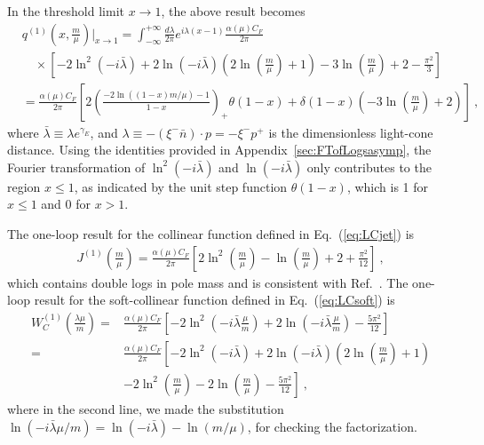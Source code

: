 \documentclass[a4paper,11pt]{article}
\begin{document}
In the threshold limit $x \rightarrow 1$, the above result becomes
\begin{align}\label{eq:LCpdfq1loopfmtr}
&q^{(1)}\left(x, \frac{m}{\mu}\right) \bigg|_{x \rightarrow 1}
= \int_{-\infty}^{+\infty} \frac{d \lambda}{2\pi} e^{i \lambda (x-1)} \frac{\alpha(\mu) C_F}{2 \pi} \nonumber\\
&\quad \times \left[ - 2 \ln^2\left(-i \bar{\lambda}\right) + 2 \ln\left(-i \bar{\lambda}\right) \left( 2 \ln\left(\frac{m}{\mu}\right) + 1 \right) - 3 \ln\left(\frac{m}{\mu}\right)+2-\frac{\pi ^2}{3} \right] \nonumber\\
&= \frac{\alpha(\mu) C_F}{2 \pi} \left[ 2 \left(\frac{- 2 \ln\left((1-x) m/\mu\right) - 1}{1-x} \right)_{+} \theta(1-x) + \delta(1-x) \left(-3\ln\left(\frac{m}{\mu}\right)+2\right) \right] \ ,
\end{align}
where $\bar{\lambda} \equiv \lambda e^{\gamma_E}$, and $\lambda \equiv - (\xi^{-} \bar{n}) \cdot p = - \xi^{-} p^{+}$ is the dimensionless light-cone distance. Using the identities provided in Appendix~\ref{sec:FTofLogsasymp}, the Fourier transformation of $\ln^2\left(-i \bar{\lambda}\right)$ and $\ln\left(-i \bar{\lambda}\right)$ only contributes to the region $x \leq 1$, as indicated by the unit step function $\theta(1-x)$, which is 1 for $x \leq 1$ and 0 for $x>1$.

The one-loop result for the collinear function defined in Eq.~(\ref{eq:LCjet}) is
\begin{align}\label{eq:Z1loopfm}
J^{(1)}\left(\frac{m}{\mu}\right) = \frac{\alpha(\mu) C_F}{2\pi} 
\left[ 2 \ln^2\left(\frac{m}{\mu}\right)
- \ln\left(\frac{m}{\mu}\right)
+ 2 + \frac{\pi ^2}{12} \right] \ ,
\end{align}
which contains double logs in pole mass and is consistent with Ref.~\cite{Beneke:2023nmj}. The one-loop result for the soft-collinear function defined in Eq.~(\ref{eq:LCsoft}) is
\begin{align}\label{eq:WC1loopfm}
W_C^{(1)}\left(\frac{\lambda\mu}{m}\right) 
= & \frac{\alpha(\mu) C_F}{2\pi} \left[-2 \ln^2\left(-i \bar{\lambda} \frac{\mu}{m}\right) + 2 \ln\left(-i \bar{\lambda} \frac{\mu}{m} \right) -\frac{5 \pi ^2}{12} \right] \nonumber\\
= & \frac{\alpha(\mu) C_F}{2\pi} \left[ - 2 \ln^2\left(-i \bar{\lambda}\right) + 2 \ln\left(-i \bar{\lambda}\right) \left( 2\ln\left(\frac{m}{\mu}\right) + 1 \right) \right. \nonumber\\
&\left. - 2 \ln^2\left(\frac{m}{\mu}\right) - 2 \ln\left(\frac{m}{\mu}\right) - \frac{5\pi^2}{12} \right] \ ,
\end{align}
where in the second line, we made the substitution $\ln\left(-i \bar{\lambda} \mu/m\right) = \ln(-i \bar{\lambda}) - \ln\left(m/\mu\right)$, for checking the factorization. 
\end{document}
